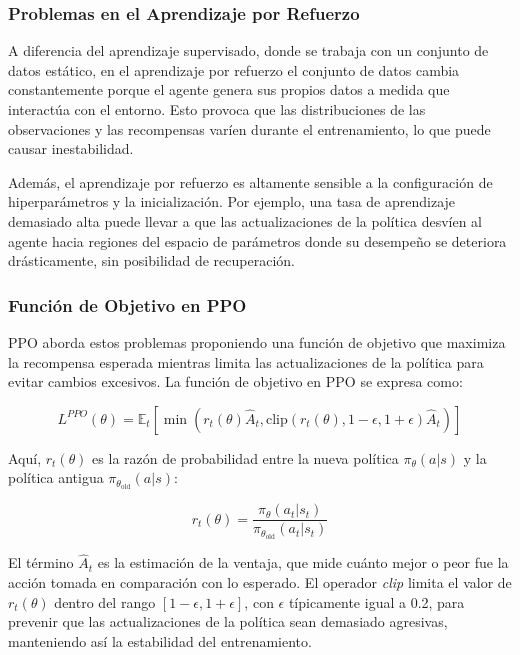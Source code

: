 \documentclass[a4paper,12pt]{report}
\begin{document}
\subsubsection{Problemas en el Aprendizaje por Refuerzo}

A diferencia del aprendizaje supervisado, donde se trabaja con un conjunto de datos estático, 
en el aprendizaje por refuerzo el conjunto de datos cambia constantemente porque el agente 
genera sus propios datos a medida que interactúa con el entorno. Esto provoca que las 
distribuciones de las observaciones y las recompensas varíen durante el entrenamiento, 
lo que puede causar inestabilidad.

Además, el aprendizaje por refuerzo es altamente sensible a la configuración de hiperparámetros 
y la inicialización. Por ejemplo, una tasa de aprendizaje demasiado alta puede llevar a que 
las actualizaciones de la política desvíen al agente hacia regiones del espacio de parámetros 
donde su desempeño se deteriora drásticamente, sin posibilidad de recuperación.

\subsubsection{Función de Objetivo en PPO}

PPO aborda estos problemas proponiendo una función de objetivo que maximiza la recompensa 
esperada mientras limita las actualizaciones de la política para evitar cambios excesivos. 
La función de objetivo en PPO se expresa como:

\[
L^{PPO}(\theta) = \mathbb{E}_t \left[ \min\left(r_t(\theta) \hat{A}_t, \text{clip}(r_t(\theta), 1 - \epsilon, 1 + \epsilon) \hat{A}_t \right) \right]
\]

Aquí, \( r_t(\theta) \) es la razón de probabilidad entre la nueva política \(\pi_\theta(a|s)\) 
y la política antigua \(\pi_{\theta_{\text{old}}}(a|s)\):

\[
r_t(\theta) = \frac{\pi_\theta(a_t|s_t)}{\pi_{\theta_{\text{old}}}(a_t|s_t)}
\]

El término \(\hat{A}_t\) es la estimación de la ventaja, que mide cuánto mejor o peor fue la 
acción tomada en comparación con lo esperado. El operador \textit{clip} limita el valor de 
\(r_t(\theta)\) dentro del rango \([1 - \epsilon, 1 + \epsilon]\), con \(\epsilon\) típicamente 
igual a 0.2, para prevenir que las actualizaciones de la política sean demasiado agresivas,
manteniendo así la estabilidad del entrenamiento.
\end{document}
